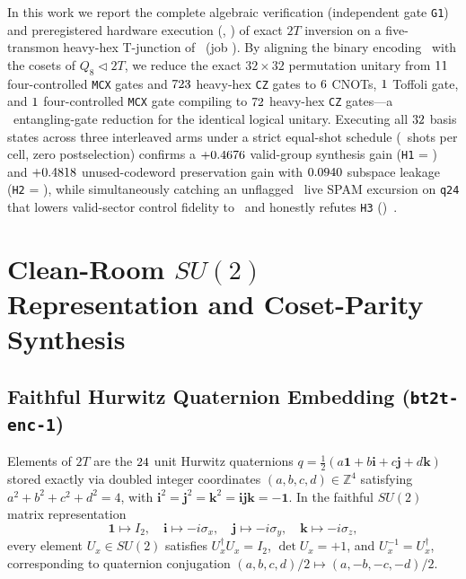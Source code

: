 \documentclass[aps,prx,twocolumn,superscriptaddress,nofootinbib]{revtex4-2}
\begin{document}
In this work we report the complete algebraic verification (independent gate \texttt{G1}) and preregistered hardware execution (\btProtocolId, \btCardId) of exact $2T$ inversion on a five-transmon heavy-hex T-junction of \btBackend\ (job \btJobId). By aligning the binary encoding \btEncVer\ with the cosets of $Q_8 \triangleleft 2T$, we reduce the exact $32\times 32$ permutation unitary from $11$ four-controlled \texttt{MCX} gates and $723$ heavy-hex \texttt{CZ} gates to $6$ CNOTs, $1$ Toffoli gate, and $1$ four-controlled \texttt{MCX} gate compiling to $72$ heavy-hex \texttt{CZ} gates---a \btCzRatioTf\ entangling-gate reduction for the identical logical unitary. Executing all $32$ basis states across three interleaved arms under a strict equal-shot schedule (\btShotsPerCell\ shots per cell, zero postselection) confirms a $+0.4676$ valid-group synthesis gain (\texttt{H1} = \btHOneVerdict) and $+0.4818$ unused-codeword preservation gain with $0.0940$ subspace leakage (\texttt{H2} = \btHTwoVerdict), while simultaneously catching an unflagged \btQTwentyFourStaleX\ live SPAM excursion on \texttt{q24} that lowers valid-sector control fidelity to \btPValidCtrlRaw\ and honestly refutes \texttt{H3} (\btHThreeVerdict)~\cite{DavisRO0607Zenodo2026}.

\section{Clean-Room $SU(2)$ Representation and Coset-Parity Synthesis}

\subsection{Faithful Hurwitz Quaternion Embedding (\texttt{bt2t-enc-1})}
Elements of $2T$ are the $24$ unit Hurwitz quaternions $q = \tfrac{1}{2}(a\mathbf{1} + b\mathbf{i} + c\mathbf{j} + d\mathbf{k})$ stored exactly via doubled integer coordinates $(a,b,c,d) \in \mathbb{Z}^4$ satisfying $a^2 + b^2 + c^2 + d^2 = 4$, with $\mathbf{i}^2 = \mathbf{j}^2 = \mathbf{k}^2 = \mathbf{i}\mathbf{j}\mathbf{k} = -\mathbf{1}$. In the faithful $SU(2)$ matrix representation
\begin{equation}
  \mathbf{1} \mapsto I_2,\quad
  \mathbf{i} \mapsto -i\sigma_x,\quad
  \mathbf{j} \mapsto -i\sigma_y,\quad
  \mathbf{k} \mapsto -i\sigma_z,
  \label{eq:su2_map}
\end{equation}
every element $U_x \in SU(2)$ satisfies $U_x^\dagger U_x = I_2$, $\det U_x = +1$, and $U_x^{-1} = U_x^\dagger$, corresponding to quaternion conjugation $(a,b,c,d)/2 \mapsto (a,-b,-c,-d)/2$.
\end{document}
